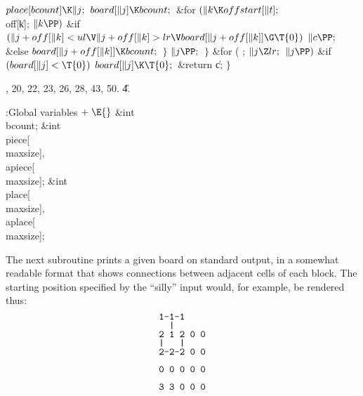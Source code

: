${}\\{place}[\\{bcount}]\K\|j;{}$\6
${}\\{board}[\|j]\K\\{bcount};{}$\6
\&{for} ${}(\|k\K\\{offstart}[\|t];{}$ \\{off}[\|k]; ${}\|k\PP){}$\1\6
\&{if} ${}(\|j+\\{off}[\|k]<\\{ul}\V\|j+\\{off}[\|k]>\\{lr}\V\\{board}[\|j+%
\\{off}[\|k]]\G\T{0}){}$\1\5
${}\|c\PP;{}$\2\6
\&{else}\1\5
${}\\{board}[\|j+\\{off}[\|k]]\K\\{bcount};{}$\2\2\6
\4${}\}{}$\2\6
${}\|j\PP;{}$\6
\4${}\}{}$\2\6
\&{for} ( ; ${}\|j\Z\\{lr};{}$ ${}\|j\PP){}$\1\6
\&{if} ${}(\\{board}[\|j]<\T{0}){}$\1\5
${}\\{board}[\|j]\K\T{0};{}$\2\2\6
\&{return} \|c;\6
\4${}\}{}$\2\par
{}, 20, 22, 23, 26, 28, 43, 50.
\U4.\fi

\B{}:Global variables\X${}\mathrel+\E{}$\6
\&{int} \\{bcount};\6
\&{int} \\{piece}[\\{maxsize}]${},{}$ \\{apiece}[\\{maxsize}];\6
\&{int} \\{place}[\\{maxsize}]${},{}$ \\{aplace}[\\{maxsize}];\par
\fi

The next subroutine prints a given board on standard
output,
in a somewhat readable format that shows connections between
adjacent cells of each block. The starting position
specified by the ``silly'' input would, for example, be rendered thus:
$$\catcode`\!=\active \chardef!="7C %
\obeyspaces
\vbox{\baselineskip=9pt\halign{\tt#\hfill\cr
1-1-1\cr
{}  !\cr
2 1 2 0 0\cr
!   !\cr
2-2-2 0 0\cr
\cr
0 0 0 0 0\cr
\cr
3 3 0 0 0\cr}}$$

